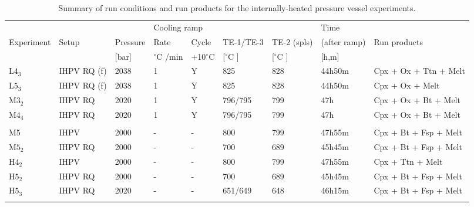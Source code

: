 \documentclass[final,authoryear,3p,times,twocolumn]{elsarticle}
\newcommand{\dgC}{$^\circ$C }
\begin{document}
 \begin{table}[htpb]
\caption{Summary of run conditions and run products for the internally-heated pressure vessel experiments.} 
\begin{adjustbox}{max width=\textwidth}
\begin{tabular}{lllllllll}
\toprule            &                 &           & \multicolumn{2}{l}{Cooling ramp} &           &             & Time         &          \\
Experiment   & Setup           & Pressure  & Rate         & Cycle & TE-1/TE-3 & TE-2 (spls) & (after ramp) & Run products         \\
             &                 & {[}bar{]} & \dgC/min       & +10\dgC & {[}\dgC{]}  & {[}\dgC{]}    & {[}h,m{]}     &                      \\ \midrule
L$4_3$        & IHPV RQ (f) 	   & 2038      & 1            & Y     & 825       & 828         & 44h50m       & Cpx + Ox + Ttn + Melt \\
L$5_3$        & IHPV RQ (f)     & 2038      & 1            & Y     & 825       & 828         & 44h50m       & Cpx + Ox + Melt       \\
M$3_2$        & IHPV RQ        & 2020      & 1            & Y     & 796/795   & 799         & 47h         & Cpx + Ox + Bt + Melt  \\
M$4_4$        & IHPV RQ        & 2020      & 1            & Y     & 796/795   & 799         & 47h         & Cpx + Ox + Bt + Melt  \\
             &                 &           &              &       &           &             &              &                      \\
M5           & IHPV            & 2000      & -            & -     & 800       & 799         & 47h55m       & Cpx + Bt + Fsp + Melt \\
M$5_2$     & IHPV RQ        & 2000      & -            & -     & 700       & 689         & 45h45m       & Cpx + Bt + Fsp + Melt \\
H$4_2$     & IHPV            & 2000      & -            & -     & 800       & 799         & 47h55m       & Cpx + Ttn + Melt      \\
H$5_2$     & IHPV RQ        & 2000      & -            & -     & 700       & 689         & 45h45m       & Cpx + Bt + Fsp + Melt \\
H$5_3$        & IHPV RQ        & 2020      & -            & -     & 651/649   & 648         & 46h15m       & Cpx + Bt + Fsp + Melt \\
             &                 &           &              &       &           &             &              &                      \\

\end{tabular}
\end{adjustbox}
\end{table}
\end{document}
